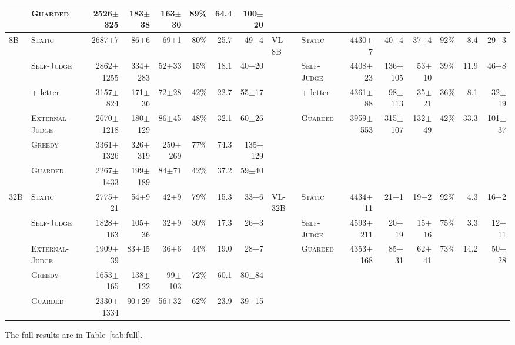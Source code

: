 \documentclass[sigconf]{acmart}
\newcommand{\HW}{\textsc{Static}}
\newcommand{\SJ}{\textsc{Self-Judge}}
\newcommand{\OJ}{\textsc{External-Judge}}
\newcommand{\BOLD}{\textsc{Greedy}}
\newcommand{\BR}{\textsc{Guarded}}
\newcommand{\pmstd}[1]{{\scriptsize$\pm$#1}}
\begin{document}
\begin{table}[t]
\begin{adjustbox}{max width=\textwidth}
\begin{tabular}{llrrrrrr@{\hspace{18pt}}llrrrrrr}
 & \BR{} & 2526\pmstd{325} & 183\pmstd{38} & 163\pmstd{30} & 89\% & 64.4 & 100\pmstd{20} & & & & & & & & \\
\midrule
8B & \HW{} & 2687\pmstd{7} & 86\pmstd{6} & 69\pmstd{1} & 80\% & 25.7 & 49\pmstd{4} &
VL-8B & \HW{} & 4430\pmstd{7} & 40\pmstd{4} & 37\pmstd{4} & 92\% & 8.4 & 29\pmstd{3} \\
 & \SJ{} & 2862\pmstd{1255} & 334\pmstd{283} & 52\pmstd{33} & 15\% & 18.1 & 40\pmstd{20} &
 & \SJ{} & 4408\pmstd{23} & 136\pmstd{105} & 53\pmstd{10} & 39\% & 11.9 & 46\pmstd{8} \\
 & \quad + letter & 3157\pmstd{824} & 171\pmstd{36} & 72\pmstd{28} & 42\% & 22.7 & 55\pmstd{17} &
 & \quad + letter & 4361\pmstd{88} & 98\pmstd{113} & 35\pmstd{21} & 36\% & 8.1 & 32\pmstd{19} \\
 & \OJ{} & 2670\pmstd{1218} & 180\pmstd{129} & 86\pmstd{45} & 48\% & 32.1 & 60\pmstd{26} &
 & \BR{} & 3959\pmstd{553} & 315\pmstd{107} & 132\pmstd{49} & 42\% & 33.3 & 101\pmstd{37} \\
 & \BOLD{} & 3361\pmstd{1326} & 326\pmstd{319} & 250\pmstd{269} & 77\% & 74.3 & 135\pmstd{129} & & & & & & & & \\
 & \BR{} & 2267\pmstd{1433} & 199\pmstd{189} & 84\pmstd{71} & 42\% & 37.2 & 59\pmstd{40} & & & & & & & & \\
\midrule
32B & \HW{} & 2775\pmstd{21} & 54\pmstd{9} & 42\pmstd{9} & 79\% & 15.3 & 33\pmstd{6} &
VL-32B & \HW{} & 4434\pmstd{11} & 21\pmstd{1} & 19\pmstd{2} & 92\% & 4.3 & 16\pmstd{2} \\
 & \SJ{} & 1828\pmstd{163} & 105\pmstd{36} & 32\pmstd{9} & 30\% & 17.3 & 26\pmstd{3} &
 & \SJ{} & 4593\pmstd{211} & 20\pmstd{19} & 15\pmstd{16} & 75\% & 3.3 & 12\pmstd{11} \\
 & \OJ{} & 1909\pmstd{39} & 83\pmstd{45} & 36\pmstd{6} & 44\% & 19.0 & 28\pmstd{7} &
 & \BR{} & 4353\pmstd{168} & 85\pmstd{31} & 62\pmstd{41} & 73\% & 14.2 & 50\pmstd{28} \\
 & \BOLD{} & 1653\pmstd{165} & 138\pmstd{122} & 99\pmstd{103} & 72\% & 60.1 & 80\pmstd{84} & & & & & & & & \\
 & \BR{} & 2330\pmstd{1334} & 90\pmstd{29} & 56\pmstd{32} & 62\% & 23.9 & 39\pmstd{15} & & & & & & & & \\
\bottomrule
\end{tabular}
\end{adjustbox}
\end{table}

The full results are in Table~\ref{tab:full}.
\end{document}
